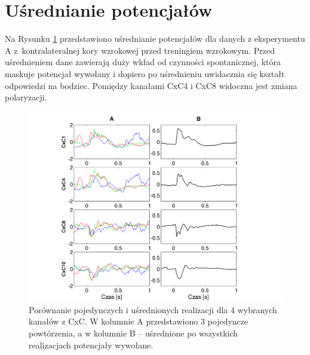 \documentclass{pracamgr_2}
\begin{document}
	\section{Uśrednianie potencjałów}
	Na Rysunku \ref{rys:usrednione_CxC} przedstawiono uśrednianie potencjałów dla danych z eksperymentu A z~kontralateralnej kory wzrokowej przed treningiem wzrokowym. Przed uśrednieniem dane zawierają duży wkład od czynności spontanicznej, która maskuje potencjał wywołany i dopiero po uśrednieniu uwidacznia się kształt odpowiedzi na bodziec. Pomiędzy kanałami CxC4 i CxC8 widoczna jest zmiana polaryzacji.
	\begin{figure}[htbp]
		\begin{center}
			\includegraphics[scale=0.65]{usrednione_CxC.png}
		\end{center}
		\caption{Porównanie pojedynczych i uśrednionych realizacji dla 4 wybranych kanałów z CxC. W kolumnie A przedstawiono 3 pojedyncze powtórzenia, a w kolumnie B -- uśrednione po wszystkich realizacjach potencjały wywołane.}
		\label{rys:usrednione_CxC}
	\end{figure}
	\FloatBarrier
\end{document}

